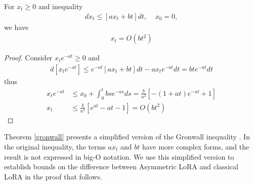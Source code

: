 \begin{theorem}
    \label{gronwall}
    For $x_t\geq 0$ and inequality
    \begin{align}
        dx_t\leq [ax_t+bt]dt,~~~~~x_0=0,
    \end{align}
    we have
    \begin{align}
        x_t=O(bt^2)
    \end{align}
\end{theorem}
\begin{proof}
    Consider $x_te^{-at}\geq 0$ and
    \begin{align}
        d\left[x_te^{-at}\right]\leq e^{-at}[ax_t+bt]dt-ax_te^{-at}dt=bte^{-at}dt
    \end{align}
    thus
    \begin{align}
        x_te^{-at}&\leq x_0+\int_0^tbse^{-as}ds=\frac{b}{a^2}[-(1+at)e^{-at}+1]\\
        x_t&\leq \frac{b}{a^2}[e^{at}-at-1]=O(bt^2)
    \end{align}
\end{proof}
\begin{remark}
    Theorem \ref{gronwall} presents a simplified version of the Gronwall inequality \cite{howard1998gronwall}. In the original inequality, the terms $ax_t$ and $bt$ have more complex forms, and the result is not expressed in big-O notation. We use this simplified version to establish bounds on the difference between Asymmetric LoRA and classical LoRA in the proof that follows.
\end{remark}

